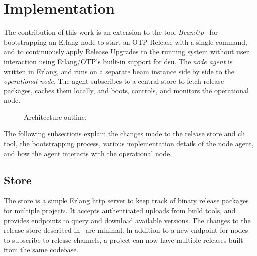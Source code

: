\section{Implementation}

The contribution of this work is an extension to the tool \emph{BeamUp}~\cite{zak18} for bootstrapping an Erlang node to start an OTP Release with a single command, and to continuously apply Release Upgrades to the running system without user interaction using Erlang/OTP's built-in support for \acrshort{dsu}. The \emph{node agent} is written in Erlang, and runs on a separate \acrshort{beam} instance side by side to the \emph{operational node}. The agent subscribes to a central store to fetch release packages, caches them locally, and boots, controls, and monitors the operational node.


\begin{figure}[h]
  \centering
  \caption{Architecture outline.}\label{fig:impl}
\end{figure}

The following subsections explain the changes made to the release store and \acrshort{cli} tool, the bootstrapping process, various implementation details of the node agent, and how the agent interacts with the operational node.

\subsection{Store}

The store is a simple Erlang \acrshort{http} server to keep track of binary release packages for multiple projects. It accepts authenticated uploads from build tools, and provides endpoints to query and download available versions. The changes to the release store described in~\cite{zak18} are minimal. In addition to a new endpoint for nodes to subscribe to release channels, a project can now have multiple releases built from the same codebase.

